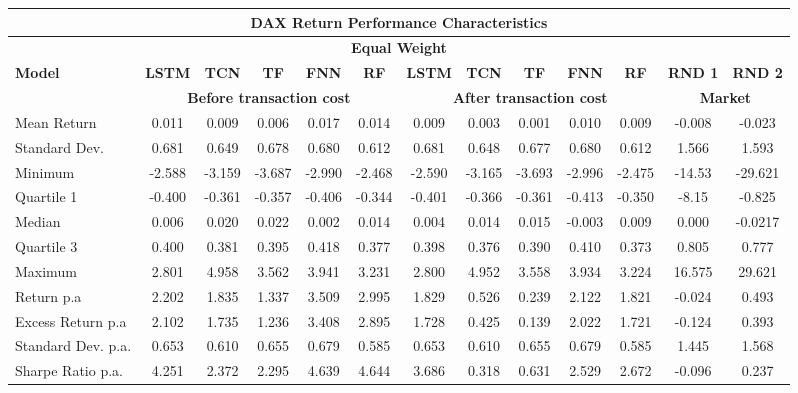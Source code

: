 \documentclass{article}
\begin{document}
\begin{table}[h]
\resizebox{\textwidth}{!}{}
\scriptsize	
\centering
\begin{tabular}{|p{2.4cm}|ccccc|ccccc|cc|}
\hline
\multicolumn{13}{|c|}{\textbf{DAX Return Performance Characteristics}}\\
\hline
\multicolumn{13}{|c|}{\textbf{Equal Weight}} \\ \hline
\textbf{Model} & \textbf{LSTM} & \textbf{TCN} & \textbf{TF} & \textbf{FNN} & \textbf{RF} & \textbf{LSTM} & \textbf{TCN} & \textbf{TF} & \textbf{FNN} & \textbf{RF}& \textbf{RND 1} &\textbf {RND 2}\\
\hline
\multicolumn{1}{|c|}{} & \multicolumn{5}{c|}{\textbf{Before transaction cost}} & \multicolumn{5}{c|}{\textbf{After transaction cost}} & \multicolumn{2}{c|}{\textbf{Market}}\\
\hline
Mean Return  & 0.011 & 0.009 & 0.006 & 0.017 & 0.014 
& 0.009 & 0.003 & 0.001 & 0.010 & 0.009 & -0.008 & -0.023 \\
Standard Dev. & 0.681 & 0.649 & 0.678 & 0.680 & 0.612  
& 0.681 & 0.648 & 0.677 & 0.680 & 0.612 &1.566 & 1.593\\
Minimum & -2.588 & -3.159 & -3.687 & -2.990 & -2.468 
& -2.590 & -3.165 & -3.693 & -2.996 & -2.475 & -14.53 & -29.621\\
Quartile 1 & -0.400 & -0.361 & -0.357 & -0.406 & -0.344 
 & -0.401 & -0.366 & -0.361 & -0.413 & -0.350 & -8.15 &-0.825\\
Median & 0.006 & 0.020 & 0.022 & 0.002 & 0.014 
& 0.004 & 0.014 & 0.015 & -0.003 & 0.009 & 0.000 & -0.0217\\
Quartile 3 & 0.400 & 0.381 & 0.395 & 0.418 & 0.377 
& 0.398 & 0.376 & 0.390 & 0.410 & 0.373 & 0.805 & 0.777\\
Maximum & 2.801 & 4.958 & 3.562 & 3.941 & 3.231 
& 2.800 & 4.952 & 3.558 & 3.934 & 3.224 & 16.575 & 29.621 \\
\hline
Return p.a   & 2.202 & 1.835 & 1.337 & 3.509 & 2.995 
& 1.829 & 0.526 & 0.239 & 2.122 & 1.821 
& -0.024 & 0.493\\
Excess Return p.a    &  2.102 & 1.735 & 1.236 & 3.408 & 2.895
& 1.728 & 0.425 & 0.139 & 2.022 & 1.721
& -0.124 & 0.393\\
Standard Dev. p.a. & 0.653 & 0.610 & 0.655 & 0.679 & 0.585
& 0.653 & 0.610 & 0.655 & 0.679 & 0.585
& 1.445 & 1.568\\
Sharpe Ratio p.a.& 4.251 & 2.372 & 2.295 & 4.639 & 4.644
& 3.686 & 0.318 & 0.631 & 2.529 & 2.672 
& -0.096 & 0.237 \\
\hline


\end{tabular}
\end{table}
\end{document}
